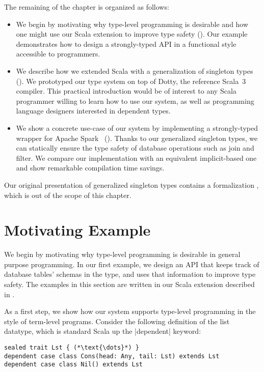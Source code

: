 The remaining of the chapter is organized as follows:

\begin{itemize}
\item
  We begin by motivating why type-level programming is desirable and how one might use our Scala extension to improve type safety (). Our example demonstrates how to design a strongly-typed API in a functional style accessible to programmers.
\item
  We describe how we extended Scala with a generalization of singleton types ().
  We prototyped our type system on top of Dotty, the reference Scala~3 compiler.
  This practical introduction would be of interest to any Scala programmer willing to learn how to use our system, as well as programming language designers interested in dependent types.
\item
  We show a concrete use-case of our system by implementing a strongly-typed wrapper for Apache Spark~\citep{zaharia2016apache} ().
  Thanks to our generalized singleton types, we can statically ensure the type safety of database operations such as join and filter.
  We compare our implementation with an equivalent implicit-based one and show remarkable compilation time savings.
\end{itemize}

Our original presentation of generalized singleton types contains a formalization \citep[Section 3 and 4]{schmid2020coming}, which is out of the scope of this chapter.

\section{Motivating Example}
\label{sec:motivating-example}

We begin by motivating why type-level programming is desirable in general purpose programming.
In our first example, we design an API that keeps track of database tables' schemas in the type, and uses that information to improve type safety.
The examples in this section are written in our Scala extension described in .

As a first step, we show how our system supports type-level programming in the style of term-level programs.
Consider the following definition of the list datatype, which is standard Scala up the |dependent| keyword:

\begin{lstlisting}
sealed trait Lst { (*\text{\dots}*) }
dependent case class Cons(head: Any, tail: Lst) extends Lst
dependent case class Nil() extends Lst
\end{lstlisting}

